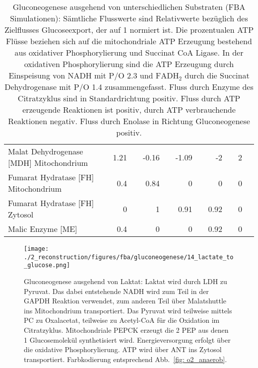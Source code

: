 \begin{landscape}
\begin{table}[!htp]
\begin{tabular}{l rr rr rr rr rr}
\hspace*{5mm}Malat Dehydrogenase [MDH] Mitochondrium & 1.21 &  & -0.16 &  & -1.09 &  & -2 &  & 2 & \\
\hspace*{5mm}Fumarat Hydratase [FH] Mitochondrium & 0.4 &  & 0.84 &  & 0 &  & 0 &  & 0\\
\hspace*{5mm}Fumarat Hydratase [FH] Zytosol & 0 &  & 1 &  & 0.91 &  & 0.92 &  & 0\\
\hspace*{5mm}Malic Enzyme [ME] & 0.4 &  & 0 &  & 0 &  & 0.92 &  & 0\\
\bottomrule
\end{tabular}
\label{tab: gluconeogenesis} 
\caption{Gluconeogenese ausgehend von unterschiedlichen Substraten (FBA Simulationen): Sämtliche Flusswerte sind Relativwerte bezüglich des Zielflusses Glucoseexport, der auf 1 normiert ist. Die prozentualen ATP Flüsse beziehen sich auf die mitochondriale ATP Erzeugung bestehend aus oxidativer Phosphorylierung und Succinat CoA Ligase. In der oxidativen Phosphorylierung sind die ATP Erzeugung durch Einspeisung von NADH mit P/O 2.3 und $\text{FADH}_2$ durch die Succinat Dehydrogenase mit P/O 1.4 zusammengefasst. Fluss durch Enzyme des Citratzyklus sind in Standardrichtung positiv. Fluss durch ATP erzeugende Reaktionen ist positiv, durch ATP verbrauchende Reaktionen negativ. Fluss durch Enolase in Richtung Gluconeogenese positiv.}
\normalsize
\end{table}
\end{landscape}

\begin{figure}[!htp]
 \centering
 \texttt{[image: ./2\_reconstruction/figures/fba/gluconeogenese/14\_lactate\_to\_glucose.png]}%
 \caption{Gluconeogenese ausgehend von Laktat: Laktat wird durch LDH zu Pyruvat. Das dabei entstehende NADH wird zum Teil in der GAPDH Reaktion verwendet, zum anderen Teil über Malatshuttle ins Mitochondrium transportiert. Das Pyruvat wird teilweise mittels PC zu Oxalacetat, teilweise zu Acetyl-CoA für die Oxidation im Citratzyklus. Mitochondriale PEPCK erzeugt die 2 PEP aus denen 1 Glucosemolekül synthetisiert wird. Energieversorgung erfolgt über die oxidative Phosphorylierung. ATP wird über ANT ins Zytosol transportiert. Farbkodierung entsprechend Abb.~\ref{fig: o2_anaerob}.}
 \label{fig: 14_lactate_to_glucose}
\end{figure}

